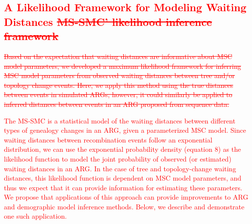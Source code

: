 \documentclass[11pt]{article}
\begin{document}
\textcolor{red}{
\subsection{
	\textcolor{red}{
		A Likelihood Framework for Modeling Waiting Distances 
		\sout{MS-SMC’ likelihood inference framework}
	}
}
\sout{
Based on the expectation that waiting distances are informative 
about MSC model parameters, we developed a maximum likelihood framework 
for inferring MSC model parameters from observed waiting distances between
tree and/or topology change events. Here, we apply this method using the 
true distances between events in simulated ARGs, however, it could similarly
be applied to inferred distances between events in an ARG proposed from 
sequence data.
}
}
\textcolor{red}{
The MS-SMC is a statistical model of the waiting distances between 
different types of genealogy changes in an ARG, given a parameterized MSC model. 
Since waiting distances between recombination events follow an exponential 
distribution, we can use the exponential probability density (equation 8) 
as the likelihood function to model the joint probability of observed 
(or estimated) waiting distances in an ARG.
In the case of tree and topology-change waiting distances, 
this likelihood function is dependent on MSC model parameters, and thus
we expect that it can provide information for estimating these parameters.
We propose that applications of this approach can provide 
improvements to ARG and demographic model inference methods. Below, we
describe and demonstrate one such application.
}
% 
% 
% 
% 
\end{document}
